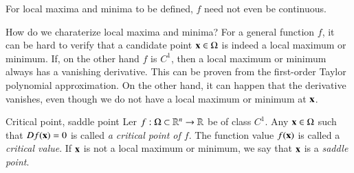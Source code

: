 For local maxima and minima to be defined, $f$ need not even be continuous.

How do we charaterize local maxima and minima? For a general function $f$, it can be hard to verify that a candidate point $\mathbf{x}\in\Omega$ is indeed a local maximum or minimum. If, on the other hand $f$ is $C^1$, then a local maximum or minimum always has a vanishing derivative. This can be proven from the first-order Taylor polynomial approximation. On the other hand, it can happen that the derivative vanishes, even though we do not have a local maximum or minimum at $\mathbf{x}$.

\begin{myDefinition}{Critical point, saddle point}{}
Ler $f : \Omega \subset\mathbb{R}^n\to\mathbb{R}$ be of class $C^1$. Any $\mathbf{x}\in\Omega$ such that $Df(\mathbf{x})=0$ is called \emph{a critical point of $f$}. The function value $f(\mathbf{x})$ is called a \emph{critical value}. If $\mathbf{x}$ is not a local maximum or minimum, we say that $\mathbf{x}$ is a \emph{saddle point}.
\end{myDefinition}

